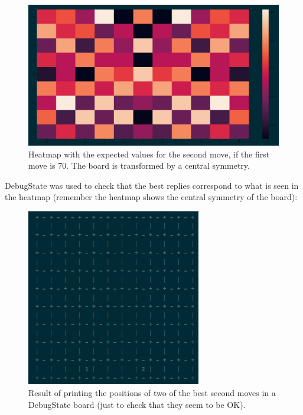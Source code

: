\documentclass[a4paper,12pt]{article}
\begin{document}
\pagebreak
\begin{figure}[!h]
\centering
\includegraphics[width=5.0in]{second_move.png}
\caption{Heatmap with the expected values for the second move, if the first move is 70. The board is transformed by a central symmetry.}
\end{figure}

DebugState was used to check that the best replies correspond to what is seen in the heatmap (remember the heatmap shows the central symmetry of the board):

\pagebreak
\begin{figure}[!h]
\centering
\includegraphics[width=3.0in]{best_second_a.png}
\caption{Result of printing the positions of two of the best second moves in a DebugState board (just to check that they seem to be OK).}
\end{figure}
\end{document}
